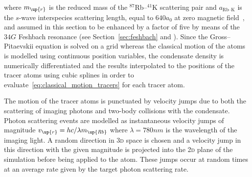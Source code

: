 where $m_\up{r}$ is the reduced mass of the $^{87}$Rb--$^{41}$K scattering pair and 
$a_{\textrm{Rb--K}}$ is the $s$-wave interspecies scattering length, equal to $640 a_0$ at zero magnetic field~\cite{thalhammer_double_2008}, and assumed in this section to be enhanced by a factor of five by means of the $34\unit{G}$ Feshbach resonance (see Section~\ref{sec:feshbach} and ). Since the Gross--Pitaevskii equation is solved on a grid whereas the classical motion of the atoms is modelled using continuous position variables, the condensate density is numerically differentiated and the results interpolated to the positions of the tracer atoms using cubic splines in order to evaluate~\eqref{eq:classical_motion_tracers} for each tracer atom.

The motion of the tracer atoms is punctuated by velocity jumps due to both the scattering of imaging photons and two-body collisions with the condensate. Photon scattering events are modelled as instantaneous velocity jumps of magnitude $v_\up{r} = hc/\lambda m_\up{Rb}$ where $\lambda=780\unit{nm}$ is the wavelength of the imaging light. A random direction in \textsc{3d} space is chosen and a velocity jump in this direction with the given magnitude is projected into the \textsc{2d} plane of the simulation before being applied to the atom. These jumps occur at random times at an average rate given by the target photon scattering rate. 

